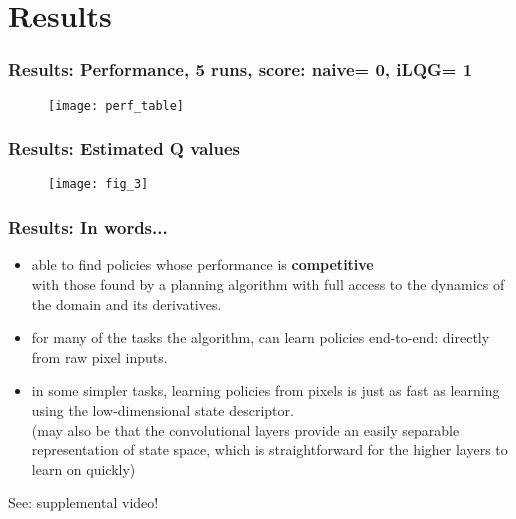 \section{Results}

\begin{frame}
\frametitle{Results: Performance, 5 runs, score: naive= 0, iLQG= 1}
\begin{figure}
    \centering
    \texttt{[image: perf\_table]}
\end{figure}
\end{frame}

\begin{frame}
\frametitle{Results: Estimated Q values}

\begin{figure}
    \centering
    \texttt{[image: fig\_3]}
\end{figure}

\end{frame}

\begin{frame}
\frametitle{Results: In words...}

\begin{itemize}
  \item able to find policies whose performance is \textbf{competitive} \\
  with those found by a planning algorithm with full access to the dynamics of the domain and its derivatives.
  \item for many of the tasks the algorithm, can learn policies end-to-end: directly from raw pixel inputs.
  \item in some simpler tasks, learning policies from pixels is just as fast as learning using the low-dimensional state descriptor.\\
  (may also be that the convolutional layers provide an easily separable representation of state space,
  which is straightforward for the higher layers to learn on quickly)
\end{itemize}

See: supplemental video!
\end{frame}

